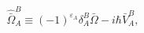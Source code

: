 \begin{equation}\label{4.9}
\hat{\bar{\Omega}}_A^B\equiv(-1)^{\varepsilon_A}\delta^B_A\bar{\Omega}-
i\hbar\bar{V}^B_A,
\end{equation}

